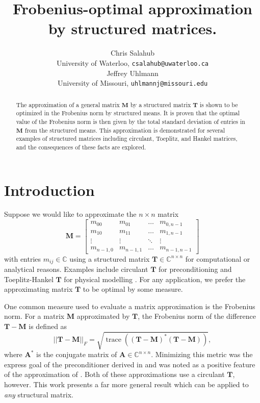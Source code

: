 \documentclass[letterpaper,12pt,oneside,final]{article}
\title{Frobenius-optimal approximation by structured matrices.}
\author{Chris Salahub \\ {\footnotesize University of Waterloo,
    \texttt{csalahub@uwaterloo.ca}} \\
Jeffrey Uhlmann \\ {\footnotesize University of Missouri, \texttt{uhlmannj@missouri.edu}}}
\newcommand{\m}[1]{\mathbf{#1}}               %
\newcommand{\conj}[1]{{#1}^{\ast}}
\newcommand{\norm}[1]{||{#1}||}              %
\newcommand{\frob}[1]{\norm{#1}_F}
\newcommand*{\trace}{\operatorname{trace}}
\newcommand{\field}[1]{\mathbb{#1}}
\newcommand{\Complex}{\field{C}}
\begin{document}
\maketitle

\begin{abstract}
  The approximation of a general matrix $\m{M}$ by a structured matrix $\m{T}$ is shown to be optimized in the Frobenius norm by structured means. It is proven that the optimal value of the Frobenius norm is then given by the total standard deviation of entries in $\m{M}$ from the structured means. This approximation is demonstrated for several examples of structured matrices including circulant, Toeplitz, and Hankel matrices, and the consequences of these facts are explored.
\end{abstract}

\section{Introduction}

Suppose we would like to approximate the $n \times n$ matrix
\begin{equation} \label{eq:Mdefn}
  \m{M} = \begin{bmatrix}
    m_{00} & m_{01} & \dots & m_{0,n-1} \\
    m_{10} & m_{11} & \dots & m_{1,n-1} \\
    \vdots & \vdots & \ddots & \vdots \\
    m_{n-1,0} & m_{n-1,1} & \dots & m_{n-1,n-1}
  \end{bmatrix}
\end{equation}
with entries $m_{ij} \in \Complex$ using a structured matrix $\m{T} \in \Complex^{n \times n}$ for computational or analytical reasons. Examples include circulant $\m{T}$ for preconditioning \cite{chan1988optimal, venkatapathi2021circulant} and Toeplitz-Hankel $\m{T}$ for physical modelling \cite{narayanshastry2021toeplitz}. For any application, we prefer the approximating matrix $\m{T}$ to be optimal by some measure.

One common measure used to evaluate a matrix approximation is the Frobenius norm. For a matrix $\m{M}$ approximated by $\m{T}$, the Frobenius norm of the difference $\m{T} - \m{M}$ is defined as
\begin{equation} \label{eq:frobnorm}
  \frob{\m{T} - \m{M}} = \sqrt{\trace \left ( \conj{(\m{T} - \m{M})}(\m{T} - \m{M}) \right )},
\end{equation}
where $\conj{\m{A}}$ is the conjugate matrix of $\m{A} \in \Complex^{n \times n}$. Minimizing this metric was the express goal of the preconditioner derived in \cite{chan1988optimal} and was noted as a positive feature of the approximation of \cite{venkatapathi2021circulant}. Both of these approximations use a circulant $\m{T}$, however. This work presents a far more general result which can be applied to \emph{any} structural matrix.
\end{document}
